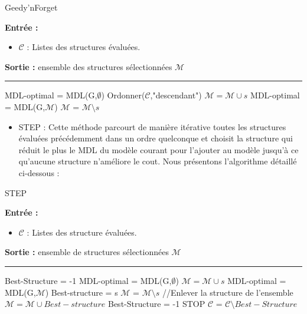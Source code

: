 \documentclass[a4paper,oneside,12pt]{report}
\theoremstyle{definition}
\begin{document}
\begin{algorithm}[H]
\label{alg:GNF}
	\caption{Geedy'nForget}
		\textbf{Entrée :}
		\begin{itemize}[label=$\bullet$]
			\item $\mathcal{C}$ : Listes des structures évaluées.
							
							
			\end{itemize}
	\textbf{Sortie :} ensemble des structures sélectionnées $\mathcal{M}$\\							\noindent\rule{\textwidth}{1pt}
								
	\begin{algorithmic} [1]
	 \STATE MDL-optimal = MDL(G,$\emptyset$)
\STATE Ordonner($\mathcal{C}$,"descendant") 
	\STATE $\mathcal{M} = \mathcal{M} \cup {s}$ 
			\STATE MDL-optimal = MDL(G,$\mathcal{M}$)
		\ELSE 
			\STATE $\mathcal{M}$ = $\mathcal{M} \setminus {s}$  
		\ENDIF
	\ENDFOR   
	\end{algorithmic}
		\end{algorithm}

\begin{itemize}
\item STEP : Cette méthode parcourt de manière itérative toutes les structures évaluées précédemment dans un ordre quelconque et choisit la structure qui réduit le plus le MDL du modèle courant pour l'ajouter au modèle jusqu'à ce qu'aucune structure n'améliore le cout. Nous présentons l'algorithme détaillé ci-dessous :


\end{itemize}

\begin{algorithm}[H]
\label{alg:STEP}
	\caption{STEP}
		\textbf{Entrée :}
		\begin{itemize}[label=$\bullet$]
			\item $\mathcal{C}$ : Listes des structure évaluées.
							
							
			\end{itemize}
	\textbf{Sortie :} ensemble de structures sélectionnées $\mathcal{M}$\\							\noindent\rule{\textwidth}{1pt}
								
	\begin{algorithmic} [1]
	\STATE Best-Structure = -1
	 \STATE MDL-optimal = MDL(G,$\emptyset$)
	\STATE $\mathcal{M} = \mathcal{M} \cup {s}$ 
			\STATE MDL-optimal = MDL(G,$\mathcal{M}$)
			\STATE Best-structure = s
		\ENDIF
		\STATE $\mathcal{M}$ = $\mathcal{M} \setminus {s}$  //Enlever la structure de l'ensemble
	\ENDFOR
	   \STATE $\mathcal{M} = \mathcal{M} \cup {Best-structure}$ 
	   \STATE Best-Structure = -1
	   \ELSE 
	   \STATE STOP
	  \ENDIF
		\STATE $\mathcal{C}$ = $\mathcal{C} \setminus {Best-Structure}$
	\ENDWHILE
	\end{algorithmic}
		\end{algorithm}
\end{document}
